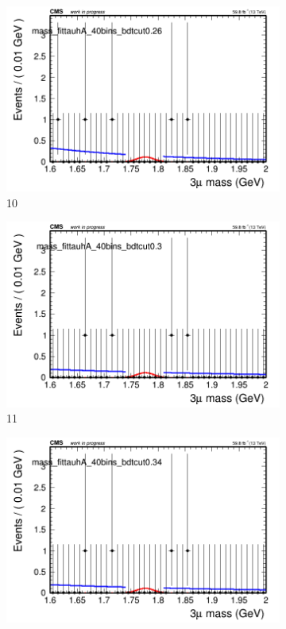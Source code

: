 \begin{figure}[h!]
\begin{subfigure}{0.2\textwidth}
        \includegraphics[width=\textwidth]{unfixed_exp/plots/tauhA/massfit_tauhA_40bins_bdtcut0.26.png}
        \caption{10}
    \end{subfigure}
    \begin{subfigure}{0.2\textwidth}
        \includegraphics[width=\textwidth]{unfixed_exp/plots/tauhA/massfit_tauhA_40bins_bdtcut0.3.png}
        \caption{11}
    \end{subfigure}
    \begin{subfigure}{0.2\textwidth}
        \includegraphics[width=\textwidth]{unfixed_exp/plots/tauhA/massfit_tauhA_40bins_bdtcut0.34.png}

\end{subfigure}
\end{figure}
